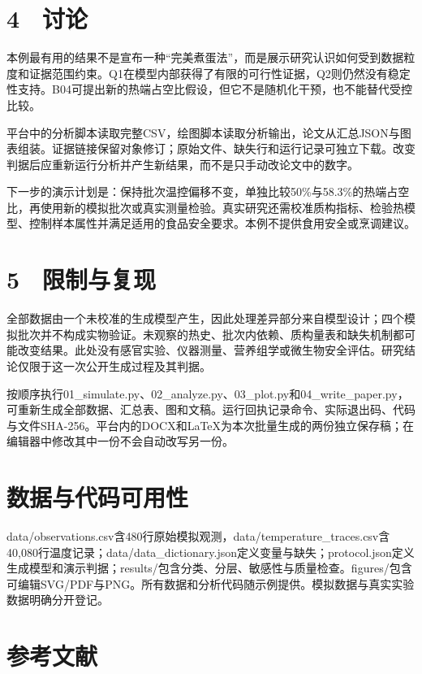 \documentclass[
  chinese,
  a4paper,
  fontset=fandol]{ctexart}
\begin{document}
\section{4　讨论}\label{ux8ba8ux8bba}

本例最有用的结果不是宣布一种``完美煮蛋法''，而是展示研究认识如何受到数据粒度和证据范围约束。Q1在模型内部获得了有限的可行性证据，Q2则仍然没有稳定性支持。B04可提出新的热端占空比假设，但它不是随机化干预，也不能替代受控比较。

平台中的分析脚本读取完整CSV，绘图脚本读取分析输出，论文从汇总JSON与图表组装。证据链接保留对象修订；原始文件、缺失行和运行记录可独立下载。改变判据后应重新运行分析并产生新结果，而不是只手动改论文中的数字。

下一步的演示计划是：保持批次温控偏移不变，单独比较50\%与58.3\%的热端占空比，再使用新的模拟批次或真实测量检验。真实研究还需校准质构指标、检验热模型、控制样本属性并满足适用的食品安全要求。本例不提供食用安全或烹调建议。

\section{5　限制与复现}\label{ux9650ux5236ux4e0eux590dux73b0}

全部数据由一个未校准的生成模型产生，因此处理差异部分来自模型设计；四个模拟批次并不构成实物验证。未观察的热史、批次内依赖、质构量表和缺失机制都可能改变结果。此处没有感官实验、仪器测量、营养组学或微生物安全评估。研究结论仅限于这一次公开生成过程及其判据。

按顺序执行01\_simulate.py、02\_analyze.py、03\_plot.py和04\_write\_paper.py，可重新生成全部数据、汇总表、图和文稿。运行回执记录命令、实际退出码、代码与文件SHA-256。平台内的DOCX和LaTeX为本次批量生成的两份独立保存稿；在编辑器中修改其中一份不会自动改写另一份。

\section{数据与代码可用性}\label{ux6570ux636eux4e0eux4ee3ux7801ux53efux7528ux6027}

data/observations.csv含480行原始模拟观测，data/temperature\_traces.csv含40,080行温度记录；data/data\_dictionary.json定义变量与缺失；protocol.json定义生成模型和演示判据；results/包含分类、分层、敏感性与质量检查。figures/包含可编辑SVG/PDF与PNG。所有数据和分析代码随示例提供。模拟数据与真实实验数据明确分开登记。

\section{参考文献}\label{ux53c2ux8003ux6587ux732e}
\end{document}
